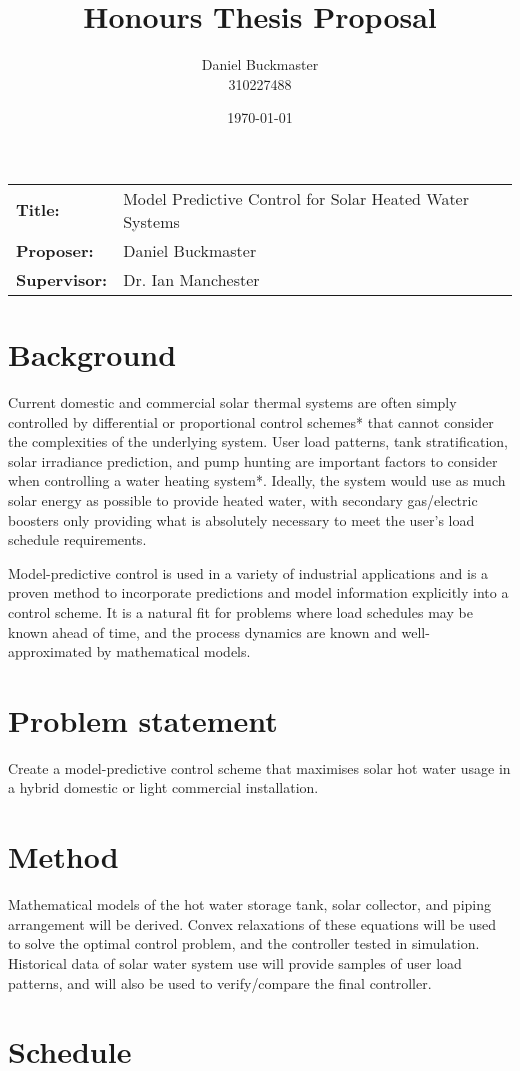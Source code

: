 \documentclass{article}
\title{Honours Thesis Proposal}
\date{\today}
\author{Daniel Buckmaster \\ 310227488}
\begin{document}
\maketitle

\begin{tabular}{ll}
	{\bf Title:} & Model Predictive Control for Solar Heated Water Systems \\
	{\bf Proposer:} & Daniel Buckmaster \\
	{\bf Supervisor:} & Dr. Ian Manchester \\
\end{tabular}

\section{Background}

Current domestic and commercial solar thermal systems are often simply controlled
by differential or proportional control schemes* that cannot consider the complexities
of the underlying system. User load patterns, tank stratification, solar
irradiance prediction, and pump hunting are important factors to consider
when controlling a water heating system*. Ideally, the system would use as much
solar energy as possible to provide heated water, with secondary gas/electric
boosters only providing what is absolutely necessary to meet the user's load
schedule requirements.

Model-predictive control is used in a variety of industrial applications \cite{Camacho04}
and is a proven method to incorporate predictions and model information explicitly into
a control scheme. It is a natural fit for problems where load schedules may be
known ahead of time, and the process dynamics are known and well-approximated by
mathematical models.

\section{Problem statement}

Create a model-predictive control scheme that maximises solar hot water usage
in a hybrid domestic or light commercial installation.

\section{Method}

Mathematical models of the hot water storage tank, solar collector, and piping
arrangement will be derived. Convex relaxations of these equations will be used
to solve the optimal control problem, and the controller tested in simulation.
Historical data of solar water system use will provide samples of user load
patterns, and will also be used to verify/compare the final controller.

\section{Schedule}



\end{document}
